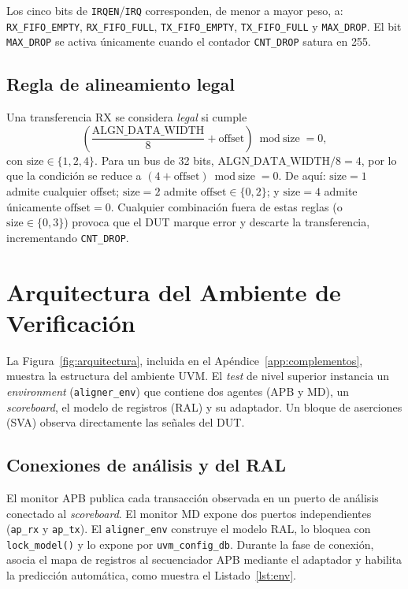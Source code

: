 \documentclass[conference]{IEEEtran}
\begin{document}
Los cinco bits de \texttt{IRQEN}/\texttt{IRQ} corresponden, de menor a mayor
peso, a: \texttt{RX\_FIFO\_EMPTY}, \texttt{RX\_FIFO\_FULL},
\texttt{TX\_FIFO\_EMPTY}, \texttt{TX\_FIFO\_FULL} y \texttt{MAX\_DROP}. El bit
\texttt{MAX\_DROP} se activa únicamente cuando el contador \texttt{CNT\_DROP}
satura en 255.

\subsection{Regla de alineamiento legal}
\label{sec:regla}
Una transferencia RX se considera \emph{legal} si cumple
\begin{equation}
\left( \frac{\text{ALGN\_DATA\_WIDTH}}{8} + \text{offset} \right) \bmod
\text{size} = 0,
\label{eq:legal}
\end{equation}
con $\text{size}\in\{1,2,4\}$. Para un bus de 32 bits,
$\text{ALGN\_DATA\_WIDTH}/8 = 4$, por lo que la condición se reduce a
$(4+\text{offset})\bmod\text{size}=0$. De aquí: $\text{size}=1$ admite cualquier
offset; $\text{size}=2$ admite $\text{offset}\in\{0,2\}$; y $\text{size}=4$
admite únicamente $\text{offset}=0$. Cualquier combinación fuera de estas reglas
(o $\text{size}\in\{0,3\}$) provoca que el DUT marque error y descarte la
transferencia, incrementando \texttt{CNT\_DROP}.

\section{Arquitectura del Ambiente de Verificación}

La Figura~\ref{fig:arquitectura}, incluida en el Apéndice~\ref{app:complementos},
muestra la estructura del ambiente UVM. El \textit{test} de nivel superior
instancia un \textit{environment} (\texttt{aligner\_env}) que contiene dos
agentes (APB y MD), un \textit{scoreboard}, el modelo de registros (RAL) y su
adaptador. Un bloque de aserciones (SVA) observa directamente las señales del
DUT.

\subsection{Conexiones de análisis y del RAL}
El monitor APB publica cada transacción observada en un puerto de análisis
conectado al \textit{scoreboard}. El monitor MD expone dos puertos
independientes (\texttt{ap\_rx} y \texttt{ap\_tx}). El \texttt{aligner\_env}
construye el modelo RAL, lo bloquea con \texttt{lock\_model()} y lo expone por
\texttt{uvm\_config\_db}. Durante la fase de conexión, asocia el mapa de
registros al secuenciador APB mediante el adaptador y habilita la predicción
automática, como muestra el Listado~\ref{lst:env}.
\end{document}

